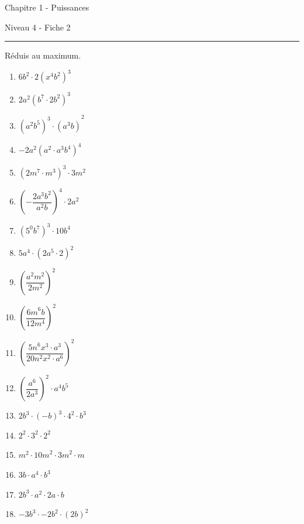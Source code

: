 \documentclass[12pt,parskip=half-, twoside=semi]{scrartcl}
\begin{document}
\newpage
\begin{center}
  \bfseries
  \begin{Huge}
    Chapitre 1 - Puissances
  \end{Huge}
  \smallbreak
  \begin{large}
    Niveau 4  - Fiche 2
  \end{large}
  \smallbreak
  \rule[10pt]{.5\linewidth}{1 pt}
\end{center}

\setcounter{exercise}{0}

\begin{exercise}
  Réduis au maximum.
  \begin{enumerate}[cols=3]
    \item \(6b^{2} \cdot 2\left( x^{4}b^{2} \right)^{3} \)
    \item \({2a^{2}\left( b^{7} \cdot 2b^{2} \right)}^{3} \)
    \item \({\left( a^{2}b^{5} \right)^{3} \cdot \left( a^{3}b \right)}^{2} \)
    \item \({- 2a^{2}\left( a^{2} \cdot a^{3}b^{4} \right)}^{4} \)
    \item \(\left( 2m^{7} \cdot m^{3} \right)^{3} \cdot 3m^{2} \)
    \item \(\left( - \dfrac{2a^{3}b^{2}}{a^{2}b} \right)^{4} \cdot 2a^{2} \)
    \item \(\left( 5^{0}b^{7} \right)^{3} \cdot 10b^{4} \)
    \item \({5a^{4} \cdot \left( 2a^{5} \cdot 2 \right)}^{2} \)
    \item \(\left( \dfrac{a^{2}m^{2}}{2m^{2}} \right)^{2} \)
    \item \(\left( \dfrac{{6m}^{6}b}{12m^{4}} \right)^{2} \)
    \item \(\left( \dfrac{{5n}^{6}x^{3} \cdot a^{3}}{20n^{2}x^{2} \cdot a^{6}} \right)^{2} \)
    \item \(\left( \dfrac{a^{6}}{2a^{3}} \right)^{2} \cdot a^{4}b^{5} \)
    \item \({2b}^{3} \cdot ( - b)^{3} \cdot 4^{2} \cdot b^{3} \)
    \item \(2^{2} \cdot 3^{2} \cdot 2^{2} \)
    \item \(m^{2} \cdot {10m}^{2} \cdot {3m}^{2} \cdot m \)
    \item \(3b \cdot a^{4} \cdot b^{3} \)
    \item \({2b}^{3} \cdot a^{2} \cdot 2a \cdot b \)
    \item \(- {3b}^{3} \cdot {- 2b}^{2} \cdot (2b)^{2} \)
  \end{enumerate}
\end{exercise}
\end{document}
